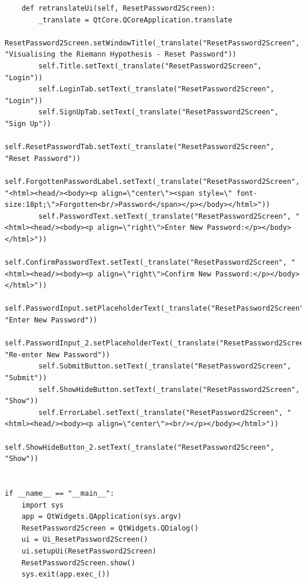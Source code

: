 \documentclass{article}
\begin{document}
\begin{lstlisting}
    def retranslateUi(self, ResetPassword2Screen):
        _translate = QtCore.QCoreApplication.translate
        ResetPassword2Screen.setWindowTitle(_translate("ResetPassword2Screen", "Visualising the Riemann Hypothesis - Reset Password"))
        self.Title.setText(_translate("ResetPassword2Screen", "Login"))
        self.LoginTab.setText(_translate("ResetPassword2Screen", "Login"))
        self.SignUpTab.setText(_translate("ResetPassword2Screen", "Sign Up"))
        self.ResetPasswordTab.setText(_translate("ResetPassword2Screen", "Reset Password"))
        self.ForgottenPasswordLabel.setText(_translate("ResetPassword2Screen", "<html><head/><body><p align=\"center\"><span style=\" font-size:18pt;\">Forgotten<br/>Password</span></p></body></html>"))
        self.PasswordText.setText(_translate("ResetPassword2Screen", "<html><head/><body><p align=\"right\">Enter New Password:</p></body></html>"))
        self.ConfirmPasswordText.setText(_translate("ResetPassword2Screen", "<html><head/><body><p align=\"right\">Confirm New Password:</p></body></html>"))
        self.PasswordInput.setPlaceholderText(_translate("ResetPassword2Screen", "Enter New Password"))
        self.PasswordInput_2.setPlaceholderText(_translate("ResetPassword2Screen", "Re-enter New Password"))
        self.SubmitButton.setText(_translate("ResetPassword2Screen", "Submit"))
        self.ShowHideButton.setText(_translate("ResetPassword2Screen", "Show"))
        self.ErrorLabel.setText(_translate("ResetPassword2Screen", "<html><head/><body><p align=\"center\"><br/></p></body></html>"))
        self.ShowHideButton_2.setText(_translate("ResetPassword2Screen", "Show"))


if __name__ == "__main__":
    import sys
    app = QtWidgets.QApplication(sys.argv)
    ResetPassword2Screen = QtWidgets.QDialog()
    ui = Ui_ResetPassword2Screen()
    ui.setupUi(ResetPassword2Screen)
    ResetPassword2Screen.show()
    sys.exit(app.exec_())
\end{lstlisting}
\end{document}
